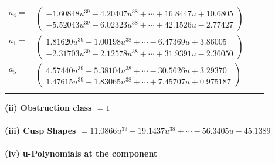 \documentclass[1p]{elsarticle_modified}
\theoremstyle{definition}
\begin{document}
\begin{tabular}{m{7pt} m{180pt} m{7pt} m{180pt} }
\flushright $a_{4}=$&$\begin{pmatrix}-1.60848 u^{39}-4.20407 u^{38}+\cdots+16.8447 u+10.6805\\-5.52043 u^{39}-6.02323 u^{38}+\cdots+42.1526 u-2.77427\end{pmatrix}$ \\
\flushright $a_{1}=$&$\begin{pmatrix}1.81620 u^{39}+1.00198 u^{38}+\cdots-6.47369 u+3.86005\\-2.31703 u^{39}-2.12578 u^{38}+\cdots+31.9391 u-2.36050\end{pmatrix}$ \\
\flushright $a_{5}=$&$\begin{pmatrix}4.57440 u^{39}+5.38104 u^{38}+\cdots-30.5626 u+3.29370\\1.47615 u^{39}+1.83065 u^{38}+\cdots+7.45707 u+0.975187\end{pmatrix}$\\&\end{tabular}
\flushleft \textbf{(ii) Obstruction class $= 1$}\\~\\
\flushleft \textbf{(iii) Cusp Shapes $= 11.0866 u^{39}+19.1437 u^{38}+\cdots-56.3405 u-45.1389$}\\~\\
\newpage\renewcommand{\arraystretch}{1}
\flushleft \textbf{(iv) u-Polynomials at the component}\newline \\
\end{document}

